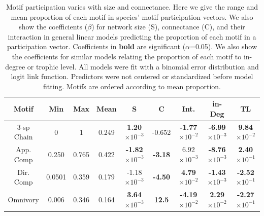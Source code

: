 \documentclass[12pt]{article}
\begin{document}
\begin{spacing}{2.0}
    \begin{table}[hb!]
        \centering
        \caption{Motif participation varies with size and connectance. Here we give the range and mean proportion of each motif in species' motif participation vectors. 
        We also show the coefficients ($\beta$) for network size (S), connectance (C), and their interaction in general linear models predicting the proportion of each motif in a participation vector.
        Coefficients in \textbf{bold} are significant ($\alpha$=0.05).
        We also show the coefficients for similar models relating the proportion of each motif to in-degree or trophic level.
        All models were fit with a binomial error distribution and logit link function.
        Predictors were not centered or standardized before model fitting. Motifs are ordered according to mean proportion.}
        \label{tab:partic_vs_SC}   
        \footnotesize
        \begin{tabular}{c|c c c | c c c | c | c}
            Motif & Min & Max & Mean & S & C & Int. & in-Deg & TL \\
            \hline
            3-sp Chain & 0 & 1 & 0.249 & \textbf{1.20$\times10^{-3}$} &  -0.652 & \textbf{-1.77$\times10^{-2}$} & \textbf{-6.99$\times10^{-3}$} & \textbf{9.84$\times10^{-2}$} \\
            App. Comp & 0.250 & 0.765 & 0.422 & \textbf{-1.82$\times10^{-3}$} & \textbf{-3.18} & 6.92$\times10^{-3}$ & \textbf{-8.76$\times10^{-3}$} & \textbf{2.40$\times10^{-1}$}\\
            Dir. Comp & 0.0501 & 0.359 & 0.179 & -1.18$\times10^{-3}$ & \textbf{-4.50} & \textbf{4.79$\times10^{-2}$} & \textbf{-1.43$\times10^{-3}$} & \textbf{-2.52$\times10^{-1}$} \\
            Omnivory & 0.006 & 0.346 & 0.164 & \textbf{3.64$\times10^{-3}$} & \textbf{12.5} & \textbf{-4.19$\times10^{-2}$} & \textbf{2.29$\times10^{-2}$} & \textbf{-2.27$\times10^{-1}$}\\   
            \hline
            \end{tabular}
            \end{table}


\end{spacing}
\end{document}
